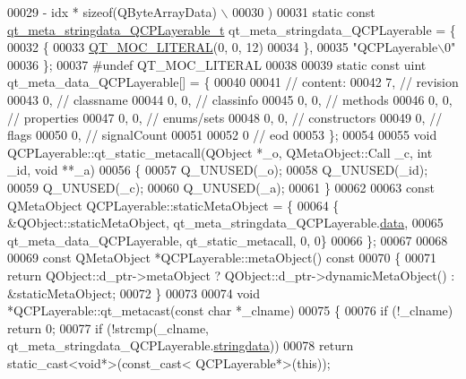 \begin{DoxyCode}
00029 \textcolor{preprocessor}{        - idx * sizeof(QByteArrayData) \(\backslash\)}
00030 \textcolor{preprocessor}{    )}
00031 \textcolor{keyword}{static} \textcolor{keyword}{const} \hyperlink{a00016_d8/d17/a00114}{qt\_meta\_stringdata\_QCPLayerable\_t} 
      qt\_meta\_stringdata\_QCPLayerable = \{
00032     \{
00033 \hyperlink{a00016_a75bb9482d242cde0a06c9dbdc6b83abe}{QT\_MOC\_LITERAL}(0, 0, 12)
00034     \},
00035     \textcolor{stringliteral}{"QCPLayerable\(\backslash\)0"}
00036 \};
00037 \textcolor{preprocessor}{#undef QT\_MOC\_LITERAL}
00038 
00039 \textcolor{keyword}{static} \textcolor{keyword}{const} uint qt\_meta\_data\_QCPLayerable[] = \{
00040 
00041  \textcolor{comment}{// content:}
00042        7,       \textcolor{comment}{// revision}
00043        0,       \textcolor{comment}{// classname}
00044        0,    0, \textcolor{comment}{// classinfo}
00045        0,    0, \textcolor{comment}{// methods}
00046        0,    0, \textcolor{comment}{// properties}
00047        0,    0, \textcolor{comment}{// enums/sets}
00048        0,    0, \textcolor{comment}{// constructors}
00049        0,       \textcolor{comment}{// flags}
00050        0,       \textcolor{comment}{// signalCount}
00051 
00052        0        \textcolor{comment}{// eod}
00053 \};
00054 
00055 \textcolor{keywordtype}{void} QCPLayerable::qt\_static\_metacall(QObject *\_o, QMetaObject::Call \_c, \textcolor{keywordtype}{int} \_id, \textcolor{keywordtype}{void} **\_a)
00056 \{
00057     Q\_UNUSED(\_o);
00058     Q\_UNUSED(\_id);
00059     Q\_UNUSED(\_c);
00060     Q\_UNUSED(\_a);
00061 \}
00062 
00063 \textcolor{keyword}{const} QMetaObject QCPLayerable::staticMetaObject = \{
00064     \{ &QObject::staticMetaObject, qt\_meta\_stringdata\_QCPLayerable.\hyperlink{a00016_a08a4a1de23442a83952a11d68453ab4d}{data},
00065       qt\_meta\_data\_QCPLayerable,  qt\_static\_metacall, 0, 0\}
00066 \};
00067 
00068 
00069 \textcolor{keyword}{const} QMetaObject *QCPLayerable::metaObject()\textcolor{keyword}{ const}
00070 \textcolor{keyword}{}\{
00071     \textcolor{keywordflow}{return} QObject::d\_ptr->metaObject ? QObject::d\_ptr->dynamicMetaObject() : &staticMetaObject;
00072 \}
00073 
00074 \textcolor{keywordtype}{void} *QCPLayerable::qt\_metacast(\textcolor{keyword}{const} \textcolor{keywordtype}{char} *\_clname)
00075 \{
00076     \textcolor{keywordflow}{if} (!\_clname) \textcolor{keywordflow}{return} 0;
00077     \textcolor{keywordflow}{if} (!strcmp(\_clname, qt\_meta\_stringdata\_QCPLayerable.\hyperlink{a00016_a4dff397c178a0aa24e1087e6ab89c187}{stringdata}))
00078         \textcolor{keywordflow}{return} \textcolor{keyword}{static\_cast<}\textcolor{keywordtype}{void}*\textcolor{keyword}{>}(\textcolor{keyword}{const\_cast<} QCPLayerable*\textcolor{keyword}{>}(\textcolor{keyword}{this}));

\end{DoxyCode}
